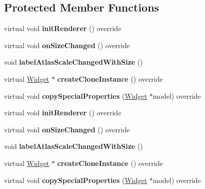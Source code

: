 \subsection*{Protected Member Functions}
\begin{DoxyCompactItemize}
\item 
\mbox{\label{classui_1_1TextAtlas_a8a144b99c08f4acbae1c48055f23e70d}} 
virtual void {\bfseries init\+Renderer} () override
\item 
\mbox{\label{classui_1_1TextAtlas_a23d24d3077470807f08d38c6d6635025}} 
virtual void {\bfseries on\+Size\+Changed} () override
\item 
\mbox{\label{classui_1_1TextAtlas_a9f88e4069eda19bbe9308106010d69ab}} 
void {\bfseries label\+Atlas\+Scale\+Changed\+With\+Size} ()
\item 
\mbox{\label{classui_1_1TextAtlas_a6062ab0f085087a2653612612b05ed8c}} 
virtual \hyperlink{classui_1_1Widget}{Widget} $\ast$ {\bfseries create\+Clone\+Instance} () override
\item 
\mbox{\label{classui_1_1TextAtlas_a20bec852cf02544ab1482f3026123722}} 
virtual void {\bfseries copy\+Special\+Properties} (\hyperlink{classui_1_1Widget}{Widget} $\ast$model) override
\item 
\mbox{\label{classui_1_1TextAtlas_a475ebed7faa1adb629957fee5a6cb4d9}} 
virtual void {\bfseries init\+Renderer} () override
\item 
\mbox{\label{classui_1_1TextAtlas_a9de82aa699a09f84e71fadd48166c41e}} 
virtual void {\bfseries on\+Size\+Changed} () override
\item 
\mbox{\label{classui_1_1TextAtlas_a9f88e4069eda19bbe9308106010d69ab}} 
void {\bfseries label\+Atlas\+Scale\+Changed\+With\+Size} ()
\item 
\mbox{\label{classui_1_1TextAtlas_a8ad436dad9b280b8d42cf6456c360fe9}} 
virtual \hyperlink{classui_1_1Widget}{Widget} $\ast$ {\bfseries create\+Clone\+Instance} () override
\item 
\mbox{\label{classui_1_1TextAtlas_aa21f2ba09171b3142548a165b0a93137}} 
virtual void {\bfseries copy\+Special\+Properties} (\hyperlink{classui_1_1Widget}{Widget} $\ast$model) override
\end{DoxyCompactItemize}
